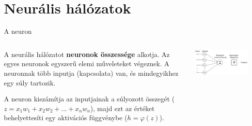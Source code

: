 \documentclass[english, aspectratio=169]{beamer}
\makeatletter
\let\origtableofcontents=\tableofcontents
\def\tableofcontents{\@ifnextchar[{\origtableofcontents}{\gobbletableofcontents}}
\def\gobbletableofcontents#1{\origtableofcontents}
\makeatother
\begin{document}
\section{Neurális hálózatok}

\begin{frame}
\tableofcontents[currentsection]
\end{frame}

\begin{frame}{A neuron}
\begin{columns}
\begin{column}{.4\textwidth}
A neurális hálózatot \textbf{neuronok összessége} alkotja. Az egyes neuronok egyszerű elemi műveleteket végeznek. A neuronnak több inputja (kapcsolata) van, és mindegyikhez egy súly tartozik.\par\smallskip
A neuron kiszámítja az inputjainak a súlyozott összegét ($z=x_1w_1 + x_2w_2 + ... + x_nw_n$), majd ezt az értéket behelyettesíti egy aktivációs függvénybe ($h=\varphi(z)$). 
\end{column}
\begin{column}{.6\textwidth}
\begin{center}
\includegraphics[width=9cm, keepaspectratio]{images/ql_21.png}
\end{center}
\end{column}
\end{columns}
\end{frame}
\end{document}
